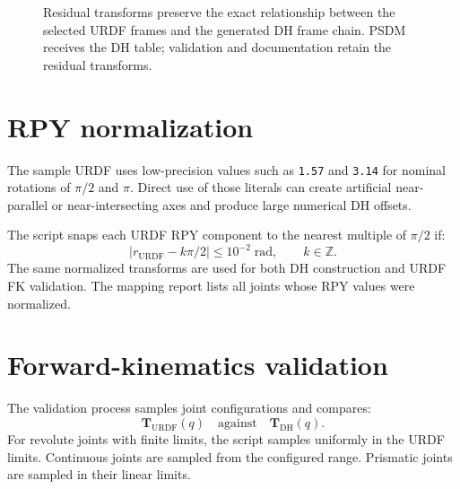 \documentclass[11pt,a4paper]{article}
\newcommand{\T}{\mathbf{T}}
\begin{document}
\begin{figure}[htbp]
\centering
{}
\caption{Residual transforms preserve the exact relationship between the selected URDF frames and the generated DH frame chain. PSDM receives the DH table; validation and documentation retain the residual transforms.}
\end{figure}

\section{RPY normalization}

The sample URDF uses low-precision values such as \texttt{1.57} and \texttt{3.14} for nominal rotations of $\pi/2$ and $\pi$. Direct use of those literals can create artificial near-parallel or near-intersecting axes and produce large numerical DH offsets.

The script snaps each URDF RPY component to the nearest multiple of $\pi/2$ if:
\begin{equation}
  |r_{\mathrm{URDF}} - k\pi/2| \leq 10^{-2}\;\mathrm{rad}, \qquad k\in\mathbb{Z}.
\end{equation}
The same normalized transforms are used for both DH construction and URDF FK validation. The mapping report lists all joints whose RPY values were normalized.

\section{Forward-kinematics validation}

The validation process samples joint configurations and compares:
\begin{equation}
  \T_{\mathrm{URDF}}(q) \quad \text{against} \quad \T_{\mathrm{DH}}(q).
\end{equation}
For revolute joints with finite limits, the script samples uniformly in the URDF limits. Continuous joints are sampled from the configured range. Prismatic joints are sampled in their linear limits.
\end{document}
